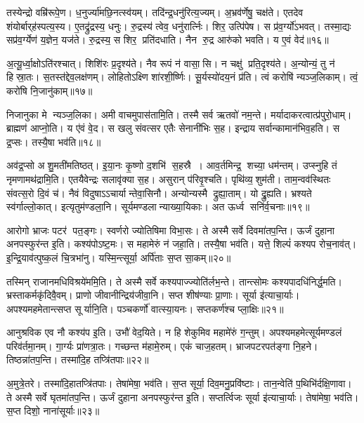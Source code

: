 तस्येन्द्रो वम्रि॑रूपे॒ण। ध॒नुर्ज्या॑मछि॒नत्स्व॑यम्। 
तदि॑न्द्र॒धनु॑रित्य॒ज्यम्। अ॒भ्रव॑र्णेषु॒ चक्ष॑ते। 
एतदेव शंयोर्बार्‌ह॑स्पत्य॒स्य। ए॒तद्रु॑द्रस्य॒ धनुः। 
रु॒द्रस्य॑ त्वेव॒ धनु॑रार्त्निः। शिर॒ उत्पि॑पेष। 
स प्र॑व॒र्ग्यो॑ऽभवत्‌। तस्मा॒द्यः सप्र॑व॒र्ग्येण॑ य॒ज्ञेन॒ यज॑ते। 
रु॒द्रस्य॒ स शिर॒ प्रति॑दधाति। नैन रु॒द्र आरु॑को भवति। य ए॒वं वेद॑॥१६॥\anuvakamend


अ॒त्यू॒र्ध्वा॒क्षोऽति॑रश्चात्‌। शिशि॑रः प्र॒दृश्य॑ते। 
नैव रूपं न॑ वासा॒सि। न चक्षु॑ प्रति॒दृश्य॑ते। 
अ॒न्योन्यं॒ तु न॑ हिस्रा॒तः। स॒तस्त॑द्देव॒लक्ष॑णम्‌। 
लोहितोऽक्ष्णि शा॑रशी॒र्ष्णिः। सू॒र्यस्यो॑दय॒नं प्र॑ति। 
त्वं करोषि॑ न्यञ्ज॒लिकाम्‌। त्वं॒ करो॑षि नि॒जानु॑काम्‌॥१७॥

निजानुका मे न्यञ्ज॒लिका। अमी वाचमुपास॑तामि॒ति। 
तस्मै सर्व ऋतवो॑ नम॒न्ते। मर्यादाकरत्वात्प्र॑\-पुरो॒धाम्। 
ब्राह्मण॑ आप्नो॒ति। य ए॑वं वे॒द। स खलु संवत्सर एतैः सेनानी॑भिः स॒ह। 
इन्द्राय सर्वान्कामान॑भिव॒हति। स द्र॒प्सः। तस्यै॒षा भव॑ति॥१८॥

अव॑द्र॒प्सो अशु॒मती॑मतिष्ठत्‌। इ॒या॒नः कृ॒ष्णो द॒शभि॑ स॒हस्रै। 
आव॒र्तमिन्द्र॒ शच्या॒ धम॑न्तम्‌। उप्स्नुहि तं नृमणामथ॑द्रामि॒ति। 
एतयैवेन्द्रः सलावृ॑क्या स॒ह। असुरान्‌ प॑रिवृ॒श्चति। 
पृथि॑व्य॒शुम॑ती। ताम॒न्वव॑स्थितः संवत्स॒रो दि॒वं च॑। 
नैवं विदुषाऽऽचार्यान्तेवा॒सिनौ। अन्योन्यस्मै द्रुह्या॒ताम्। यो द्रु॒ह्यति। 
भ्रश्यते स्व॑र्गाल्लो॒कात्‌। इत्यृतुम॑ण्डला॒नि। 
सूर्यमण्डलान्या\-ख्या॒यिकाः। अत ऊर्ध्व सनि॑र्व॒चनाः॥१९॥\anuvakamend


आरोगो भ्राजः पटर॑ पत॒ङ्गः। स्वर्णरो ज्योतिषिमा\sn{} विभा॒सः। 
ते अस्मै सर्वे दिवमा॑तप॒न्ति। ऊर्जं दुहाना अनपस्फुर॑न्त इ॒ति। 
कश्य॑पोऽष्ट॒मः। स महामेरुं न॑ जहा॒ति। 
तस्यै॒षा भव॑ति। यत्ते॒ शिल्पं॑ कश्यप रोच॒नाव॑त्‌। 
इ॒न्द्रि॒याव॑त्पुष्क॒लं चि॒त्रभा॑नु। यस्मि॒न्त्सूर्या॒ अर्पि॑ताः स॒प्त सा॒कम्‌॥२०॥

तस्मिन्‌ राजानमधिविश्रये॑ममि॒ति। ते अस्मै सर्वे कश्यपाज्ज्यो\-ति॑र्लभ॒न्ते। 
तान्त्सोमः कश्यपादधि॑निर्द्ध॒मति। भ्रस्ताकर्मकृ॑दिवै॒वम्‌। 
प्राणो जीवानीन्द्रिय॑जीवा॒नि। सप्त शी\ur{}ष॑ण्याः प्रा॒णाः। 
सूर्या इ॑त्याचा॒र्याः। अपश्यमहमेतान्त्सप्त सूर्यानि॒ति। 
पञ्चकर्णो॑ वात्स्या॒यनः। सप्तकर्ण॑श्च प्ला॒क्षिः॥२१॥

आनुश्रविक एव नौ कश्य॑प इ॒ति। उभौ॑ वेद॒यिते। 
न हि शेकुमिव महामे॑रुं ग॒न्तुम्। अपश्यमहमेत्सूर्यमण्डलं परिव॑र्तमा॒नम्। 
गा॒र्ग्यः प्रा॑णत्रा॒तः। गच्छन्त म॑हामे॒रुम्। एकं॑ चाज॒हतम्। 
भ्राजपटरपत॑ङ्गा नि॒हने। तिष्ठन्ना॑तप॒न्ति। तस्मा॑दि॒ह तप्त्रि॑तपाः॥२२॥

अ॒मुत्रे॒तरे। तस्मा॑दि॒हातप्त्रि॑तपाः। तेषा॑मेषा॒ भव॑ति। 
स॒प्त सूर्या॒ दिव॒मनु॒प्रवि॑ष्टाः। तान॒न्वेति॑ प॒थिभि॑र्दक्षि॒णावा\sn{}। 
ते अस्मै सर्वे घृतमा॑तप॒न्ति। ऊर्जं दुहाना अनपस्फुर॑न्त इ॒ति। 
सप्तर्त्विजः सूर्या इ॑त्याचा॒र्याः। तेषा॑मेषा॒ भव॑ति। स॒प्त दिशो॒ नाना॑सूर्याः॥२३॥

